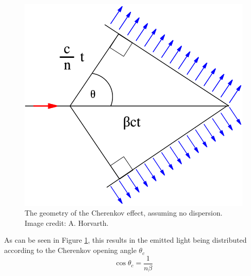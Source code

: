 \begin{figure}[t] 
        \centering \includegraphics[width=0.5\columnwidth]{figures/Cherenkov.png}

        \caption{
                \label{fig:cherenkov} %
                The geometry of the Cherenkov effect, assuming no dispersion. Image credit: A. Horvarth.
        }
\end{figure}

As can be seen in Figure \ref{fig:cherenkov}, this results in the emitted light being distributed according to the Cherenkov opening angle $\theta_c$
\begin{equation}
    \cos\theta_c=\frac{1}{n\beta}
    \label{eq:cherenkov}
\end{equation}

